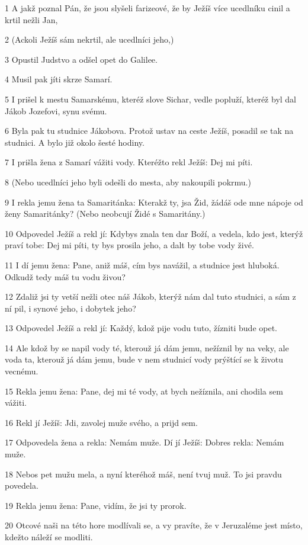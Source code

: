 \par 1 A jakž poznal Pán, že jsou slyšeli farizeové, že by Ježíš více ucedlníku cinil a krtil nežli Jan,
\par 2 (Ackoli Ježíš sám nekrtil, ale ucedlníci jeho,)
\par 3 Opustil Judstvo a odšel opet do Galilee.
\par 4 Musil pak jíti skrze Samarí.
\par 5 I prišel k mestu Samarskému, kteréž slove Sichar, vedle popluží, kteréž byl dal Jákob Jozefovi, synu svému.
\par 6 Byla pak tu studnice Jákobova. Protož ustav na ceste Ježíš, posadil se tak na studnici. A bylo již okolo šesté hodiny.
\par 7 I prišla žena z Samarí vážiti vody. Kteréžto rekl Ježíš: Dej mi píti.
\par 8 (Nebo ucedlníci jeho byli odešli do mesta, aby nakoupili pokrmu.)
\par 9 I rekla jemu žena ta Samaritánka: Kterakž ty, jsa Žid, žádáš ode mne nápoje od ženy Samaritánky? (Nebo neobcují Židé s Samaritány.)
\par 10 Odpovedel Ježíš a rekl jí: Kdybys znala ten dar Boží, a vedela, kdo jest, kterýž praví tobe: Dej mi píti, ty bys prosila jeho, a dalt by tobe vody živé.
\par 11 I dí jemu žena: Pane, aniž máš, cím bys navážil, a studnice jest hluboká. Odkudž tedy máš tu vodu živou?
\par 12 Zdaliž jsi ty vetší nežli otec náš Jákob, kterýž nám dal tuto studnici, a sám z ní pil, i synové jeho, i dobytek jeho?
\par 13 Odpovedel Ježíš a rekl jí: Každý, kdož pije vodu tuto, žízniti bude opet.
\par 14 Ale kdož by se napil vody té, kterouž já dám jemu, nežíznil by na veky, ale voda ta, kterouž já dám jemu, bude v nem studnicí vody prýštící se k životu vecnému.
\par 15 Rekla jemu žena: Pane, dej mi té vody, at bych nežíznila, ani chodila sem vážiti.
\par 16 Rekl jí Ježíš: Jdi, zavolej muže svého, a prijd sem.
\par 17 Odpovedela žena a rekla: Nemám muže. Dí jí Ježíš: Dobres rekla: Nemám muže.
\par 18 Nebos pet mužu mela, a nyní kteréhož máš, není tvuj muž. To jsi pravdu povedela.
\par 19 Rekla jemu žena: Pane, vidím, že jsi ty prorok.
\par 20 Otcové naši na této hore modlívali se, a vy pravíte, že v Jeruzaléme jest místo, kdežto náleží se modliti.
